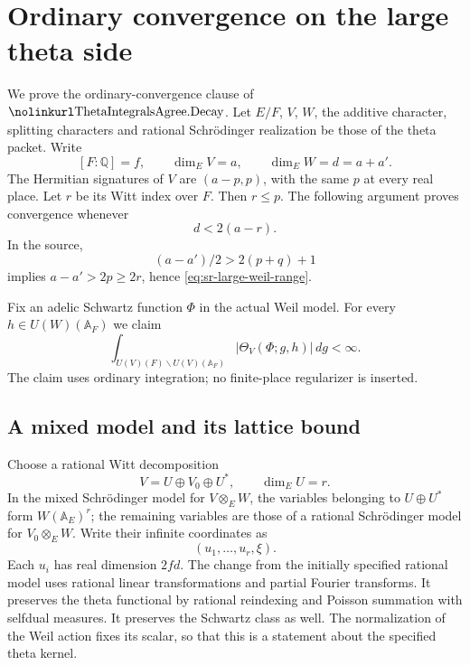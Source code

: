 \section{Ordinary convergence on the large theta side}
\label{sec:sr-large-theta-convergence}

We prove the ordinary-convergence clause of
\(\srcid{ThetaIntegralsAgree.Decay}\).
Let \(E/F\), \(V\), \(W\), the additive character, splitting
characters and rational Schr\"odinger realization be those
of the theta packet.
Write
\[
       [F:\mathbb Q]=f,\qquad
       \dim_E V=a,\qquad \dim_E W=d=a+a'.
\]
The Hermitian signatures of \(V\) are
\((a-p,p)\), with the same \(p\) at every real place.
Let \(r\) be its Witt index over \(F\).
Then \(r\le p\).
The following argument proves convergence whenever
\begin{equation}\label{eq:sr-large-weil-range}
                         d<2(a-r).
\end{equation}
In the source,
\[
     (a-a')/2>2(p+q)+1
\]
implies \(a-a'>2p\ge2r\), hence
\eqref{eq:sr-large-weil-range}.

Fix an adelic Schwartz function \(\Phi\) in the actual
Weil model.  For every \(h\in U(W)(\mathbb A_F)\) we claim
\[
 \int_{U(V)(F)\backslash U(V)(\mathbb A_F)}
                 |\Theta_V(\Phi;g,h)|\,dg<\infty .
\]
The claim uses ordinary integration; no finite-place
regularizer is inserted.

\subsection{A mixed model and its lattice bound}

Choose a rational Witt decomposition
\[
                       V=U\oplus V_0\oplus U^*,
                      \qquad\dim_EU=r .
\]
In the mixed Schr\"odinger model for \(V\otimes_EW\),
the variables belonging to \(U\oplus U^*\) form
\(W(\mathbb A_E)^r\); the remaining variables are
those of a rational Schr\"odinger model for \(V_0\otimes_EW\).
Write their infinite coordinates as
\[
                  (u_1,\dots,u_r,\xi).
\]
Each \(u_i\) has real dimension \(2fd\).
The change from the initially specified rational model
uses rational linear transformations and partial Fourier
transforms.
It preserves the theta functional by rational reindexing
and Poisson summation with selfdual measures.
It preserves the Schwartz class as well.
The normalization of the Weil action fixes its scalar,
so that this is a statement about the specified theta
kernel.

